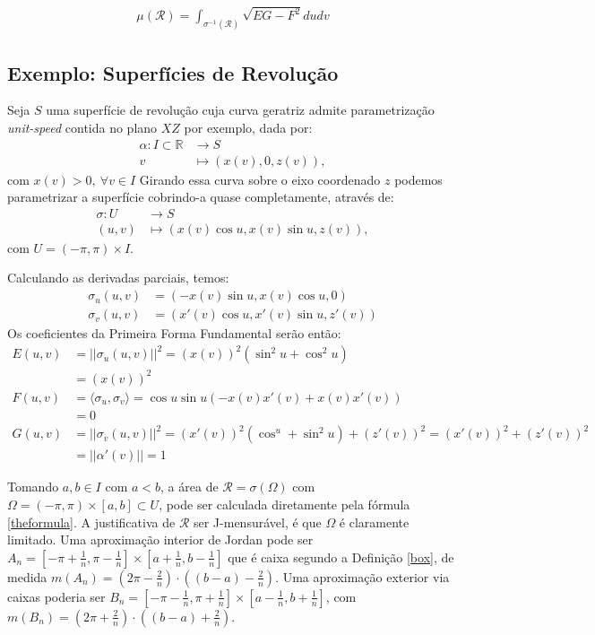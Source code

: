 \documentclass[12pt,letterpaper]{article}
\newcommand\rcur{\mathcal{R}}
\newcommand{\real}{\mathbb{R}}
\begin{document}
\begin{align}
	\displaystyle\mu(\rcur)=\int_{\sigma^{-1}(\rcur)}\sqrt{EG-F^2}dudv \label{theformula}
\end{align}

\subsection{Exemplo: Superfícies de Revolução}

 Seja $S$ uma superfície de revolução cuja curva geratriz admite parametrização \textit{unit-speed} contida no plano $XZ$ por exemplo, dada por:
\begin{align*}
	\alpha:I\subset\real&\to S\\
	v &\mapsto (x(v),0,z(v)),
\end{align*}
com $x(v)>0,~\forall v \in I$
 Girando essa curva sobre o eixo coordenado $z$ podemos parametrizar a superfície cobrindo-a quase completamente, através de:
  \begin{align*}
  	\sigma:U&\to S\\
  	(u,v)&\mapsto (x(v)\cos u,x(v)\sin u,z(v)),
  \end{align*}
com $U=(-\pi,\pi)\times I$.

Calculando as derivadas parciais, temos:
\begin{align*}
	\sigma_u(u,v)&=(-x(v)\sin u,x(v)\cos u,0)\\
	\sigma_v(u,v)&=(x'(v)\cos u,x'(v)\sin u,z'(v))
\end{align*}
Os coeficientes da Primeira Forma Fundamental serão então:
\begin{align*}
	E(u,v)&=||\sigma_u(u,v)||^2=(x(v))^2(\sin^2u+\cos^2u)\\&=(x(v))^2\\
	F(u,v)&=\langle\sigma_u,\sigma_v\rangle=\cos u\sin u(-x(v)x'(v)+x(v)x'(v))\\&=0\\
	G(u,v)&=||\sigma_v(u,v)||^2=(x'(v))^2(\cos^u+\sin^2u)+(z'(v))^2=(x'(v))^2+(z'(v))^2\\&=||\alpha'(v)||=1
\end{align*}

Tomando $a,b\in I$ com $a<b$, a área de $\rcur=\sigma(\Omega)$ com $\Omega=(-\pi,\pi)\times[a,b]\subset U$, pode ser calculada diretamente pela fórmula \ref{theformula}. A justificativa de $\rcur$ ser J-mensurável, é que $\Omega$ é claramente limitado. Uma aproximação interior de Jordan pode ser $A_n=[-\pi+\frac1n,\pi-\frac1n]\times[a+\frac1n,b-\frac1n]$ que é caixa segundo a Definição \ref{box}, de medida $m(A_n)=(2\pi-\frac2n)\cdot((b-a)-\frac2n)$. Uma aproximação exterior via caixas poderia ser $B_n=[-\pi-\frac1n,\pi+\frac1n]\times[a-\frac1n,b+\frac1n]$, com $m(B_n)=(2\pi+\frac2n)\cdot((b-a)+\frac2n)$. 
\end{document}
